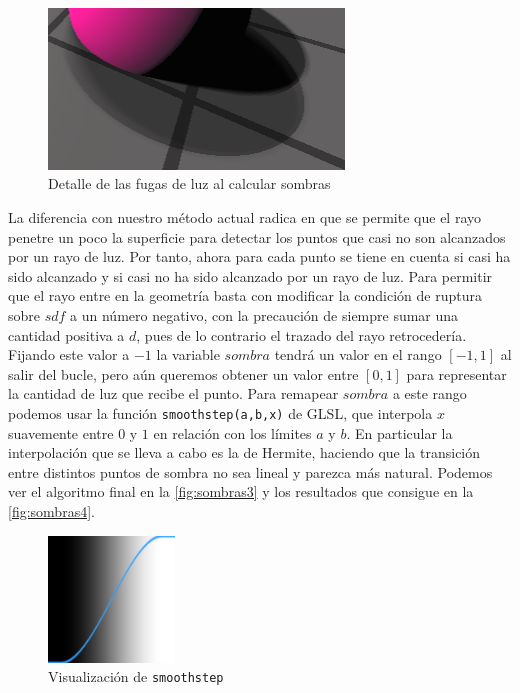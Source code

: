 \begin{figure}[ht!]
    \centering
    \includegraphics[width=0.7\textwidth]{Plantilla-TFG-master/img/shadowArtifactZoom.png}
    \caption{Detalle de las fugas de luz al calcular sombras}
    \label{fig:artifactZoom}
\end{figure}

La diferencia con nuestro método actual radica en que se permite que el rayo penetre un poco la superficie para detectar los puntos que casi no son alcanzados por un rayo de luz. Por tanto, ahora para cada punto se tiene en cuenta si casi ha sido alcanzado y si casi no ha sido alcanzado por un rayo de luz. Para permitir que el rayo entre en la geometría basta con modificar la condición de ruptura sobre $sdf$ a un número negativo, con la precaución de siempre sumar una cantidad positiva a $d$, pues de lo contrario el trazado del rayo retrocedería. Fijando este valor a $-1$ la variable $sombra$ tendrá un valor en el rango $[-1,1]$ al salir del bucle, pero aún queremos obtener un valor entre $[0,1]$ para representar la cantidad de luz que recibe el punto. Para remapear $sombra$ a este rango podemos usar la función \texttt{smoothstep(a,b,x)} de GLSL, que interpola $x$ suavemente entre $0$ y $1$ en relación con los límites $a$ y $b$. En particular la interpolación que se lleva a cabo es la de Hermite, haciendo que la transición entre distintos puntos de sombra no sea lineal y parezca más natural. Podemos ver el algoritmo final en la \autoref{fig:sombras3} y los resultados que consigue en la \autoref{fig:sombras4}.

\begin{figure}[ht!]
    \centering
    \includegraphics[width=0.3\textwidth]{Plantilla-TFG-master/img/smoothstep.png}
    \caption{Visualización de \texttt{smoothstep} \cite{smoothstep}}
\end{figure}


